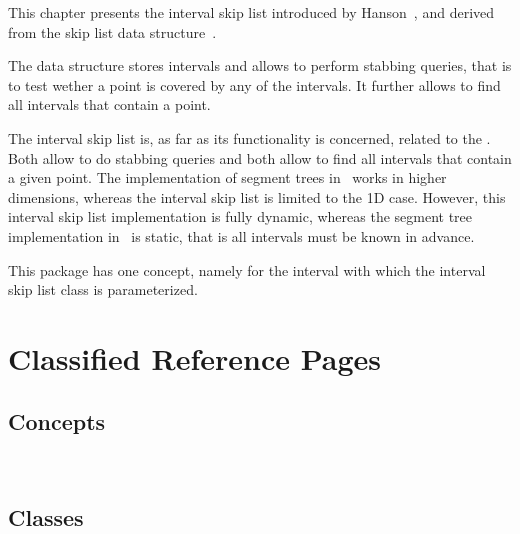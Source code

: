 
This chapter presents the interval skip list introduced by Hanson~\cite{h-islds-91},
and derived from the skip list data structure~\cite{p-slpab-90}.

The data structure stores intervals and allows to perform stabbing queries,
that is to test wether a point is covered by any of the intervals.
It further allows to find all intervals that contain a point.

The interval skip list is, as far as its functionality is concerned,
related to the . Both allow to do stabbing queries
and both allow to find all intervals that contain a given point.  The
implementation of segment trees in \cgal\ works in higher
dimensions, whereas the interval skip list is limited to the 1D
case. However, this interval skip list implementation is fully
dynamic, whereas the segment tree implementation in \cgal\ is
static, that is all intervals must be known in advance.

This package has one concept, namely for the interval with which 
the interval skip list class is parameterized.



\section{Classified Reference Pages}

\subsection*{Concepts}

\\


\subsection*{Classes}

\\
\\
\\

